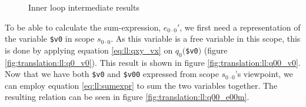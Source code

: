 \begin{figure}[!h]
\centering
{}
\qquad
{}
\qquad 
{}
\caption{Inner loop intermediate results \label{fig:translation:ll:innerIntermediate}}
\end{figure}

To be able to calculate the sum-expression, $e_{0 \cdot 0}'$, we first need a representation of the variable
\texttt{\$v0} in scope $s_{0 \cdot 0}$. As this variable is a free variable in this scope, this is done by
applying equation \ref{eq:ll:qxy_vx} on $q_{0}($\texttt{\$v0}$)$ (figure \ref{fig:translation:ll:q0_v0}). This
result is shown in figure \ref{fig:translation:ll:q00_v0}. Now that we have both \texttt{\$v0} and \texttt{\$v00}
expressed from scope $s_{0 \cdot 0}$'s viewpoint, we can employ equation \ref{eq:ll:sumexpr} to sum the two variables together. The
resulting relation can be seen in figure \ref{fig:translation:ll:q00_e00m}.

